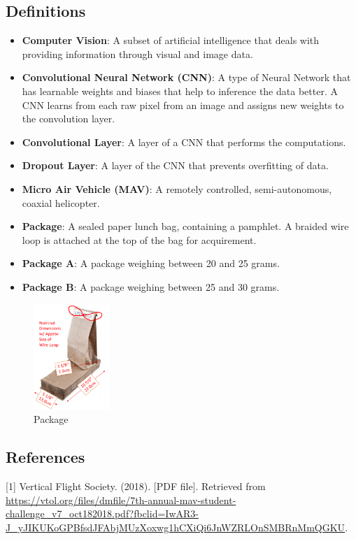 \documentclass[onecolumn, oneside, letterpaper, draftclsnofoot, 10pt, compsoc]{IEEEtran}
\begin{document}
\subsection{Definitions}
\begin{itemize}
    \item \textbf{Computer Vision}: A subset of artificial intelligence that deals with providing information through visual and image data.
    \item \textbf{Convolutional Neural Network (CNN)}: A type of Neural Network that has learnable weights and biases that help to inference the data better. A CNN learns from each raw pixel from an image and assigns new weights to the convolution layer.
    \item \textbf{Convolutional Layer}: A layer of a CNN that performs the computations.
    \item \textbf{Dropout Layer}: A layer of the CNN that prevents overfitting of data.
    \item \textbf{Micro Air Vehicle (MAV)}: A remotely controlled, semi-autonomous, coaxial helicopter.
    \item \textbf{Package}: A sealed paper lunch bag, containing a pamphlet. A braided wire loop is attached at the top of the bag for acquirement.
    \item \textbf{Package A}: A package weighing between 20 and 25 grams.
    \item \textbf{Package B}: A package weighing between 25 and 30 grams.
\end{itemize}
\begin{figure}[h!]
\centering
\includegraphics[height=4cm]{graphics/bag.eps}
\caption{Package}
\end{figure}

\subsection{References}
[1]
\newblock Vertical Flight Society. (2018).
 [PDF file].
\newblock Retrieved from \url{ https://vtol.org/files/dmfile/7th-annual-mav-student-challenge_v7_oct182018.pdf?fbclid=IwAR3-J_yJIKUKoGPBfsdJFAbjMUzXoxwg1hCXiQi6JnWZRLOnSMBRnMmQGKU}.
\end{document}
